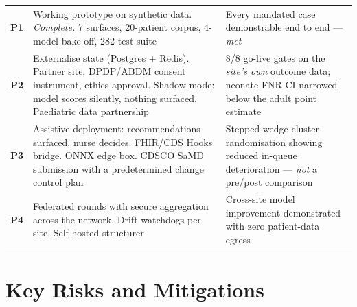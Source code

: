 \documentclass[10pt,a4paper,twocolumn]{article}
\begin{document}
{\footnotesize\sffamily
{}
\tabletail{}
\tablelasttail{\bottomrule}
\setlength{\tabcolsep}{4pt}
\begin{supertabular}{@{}p{0.95cm}p{2.85cm}p{3.8cm}@{}}
\textbf{P1} & Working prototype on synthetic data. \emph{Complete.} 7 surfaces, 20-patient corpus, 4-model bake-off, 282-test suite &
Every mandated case demonstrable end to end --- \emph{met}\\
\addlinespace[3pt]
\textbf{P2} & Externalise state (Postgres + Redis). Partner site, DPDP/ABDM consent instrument, ethics approval. Shadow mode: model scores silently, nothing surfaced. Paediatric data partnership &
8/8 go-live gates on the \emph{site's own} outcome data; neonate FNR CI narrowed below the adult point estimate\\
\addlinespace[3pt]
\textbf{P3} & Assistive deployment: recommendations surfaced, nurse decides. FHIR/CDS Hooks bridge. ONNX edge box. CDSCO SaMD submission with a predetermined change control plan &
Stepped-wedge cluster randomisation showing reduced in-queue deterioration --- \emph{not} a pre/post comparison\\
\addlinespace[3pt]
\textbf{P4} & Federated rounds with secure aggregation across the network. Drift watchdogs per site. Self-hosted structurer &
Cross-site model improvement demonstrated with zero patient-data egress\\
\end{supertabular}\par}

\section{Key Risks and Mitigations}
\label{sec:risk}
\end{document}
